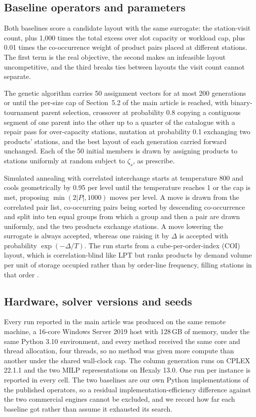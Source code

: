 \documentclass[11pt]{article}
\begin{document}
\subsection{Baseline operators and parameters}\label{sup:baselines}
Both baselines score a candidate layout with the same surrogate: the station-visit count, plus
1{,}000 times the total excess over slot capacity or workload cap, plus 0.01 times the
co-occurrence weight of product pairs placed at different stations. The first term is the real
objective, the second makes an infeasible layout uncompetitive, and the third breaks ties between
layouts the visit count cannot separate.

The genetic algorithm carries 50 assignment vectors for at most 200 generations or until the
per-size cap of Section~5.2 of the main article is reached, with binary-tournament parent
selection, crossover at probability 0.8 copying a contiguous segment of one parent into the other
up to a quarter of the catalogue with a repair pass for over-capacity stations, mutation at
probability 0.1 exchanging two products' stations, and the best layout of each generation carried
forward unchanged. Each of the 50 initial members is drawn by assigning products to stations
uniformly at random subject to $\zeta_s$, as \citet{pan2015} prescribe.

Simulated annealing with correlated interchange starts at temperature 800 and cools geometrically
by 0.95 per level until the temperature reaches 1 or the cap is met, proposing $\min(2|P|, 1000)$
moves per level. A move is drawn from the correlated pair list, co-occurring pairs being sorted by
descending co-occurrence and split into ten equal groups from which a group and then a pair are
drawn uniformly, and the two products exchange stations. A move lowering the surrogate is always
accepted, whereas one raising it by $\Delta$ is accepted with probability $\exp(-\Delta/T)$. The
run starts from a cube-per-order-index (COI) layout, which is correlation-blind like LPT but ranks
products by demand volume per unit of storage occupied rather than by order-line frequency, filling
stations in that order \citep{kim2012}.

\subsection{Hardware, solver versions and seeds}\label{sup:hardware}
Every run reported in the main article was produced on the same remote machine, a 16-core Windows
Server 2019 host with 128\,GB of memory, under the same Python 3.10 environment, and every method
received the same core and thread allocation, four threads, so no method was given more compute
than another under the shared wall-clock cap. The column generation runs on CPLEX 22.1.1 and the
two MILP representations on Hexaly 13.0. One run per instance is reported in every cell. The two
baselines are our own Python implementations of the published operators, so a residual
implementation-efficiency difference against the two commercial engines cannot be excluded, and we
record how far each baseline got rather than assume it exhausted its search.
\end{document}
